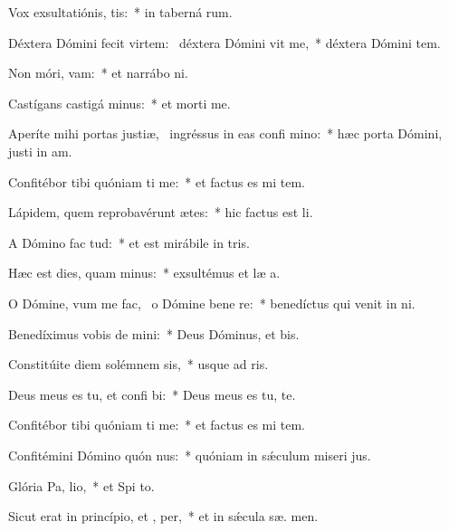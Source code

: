 \item Vox exsultatiónis,  tis:~* in taberná rum.
\item Déxtera Dómini fecit virtem:~\pscross{} déxtera Dómini vit me,~* déxtera Dómini  tem.
\item Non móri,  vam:~* et narrábo  ni.
\item Castígans castigá  minus:~* et morti   me.
\item Aperíte mihi portas justiæ,~\pscross{} ingréssus in eas confi mino:~* hæc porta Dómini, justi in  am.
\item Confitébor tibi quóniam ti me:~* et factus es mi  tem.
\item Lápidem, quem reprobavérunt ætes:~* hic factus est   li.
\item A Dómino fac  tud:~* et est mirábile in  tris.
\item Hæc est dies, quam  minus:~* exsultémus et læ  a.
\item O Dómine, vum me fac,~\pscross{} o Dómine bene re:~* benedíctus qui venit in  ni.
\item Benedíximus vobis de  mini:~* Deus Dóminus, et  bis.
\item Constitúite diem solémnem  sis,~* usque ad  ris.
\item Deus meus es tu, et confi bi:~* Deus meus es tu,   te.
\item Confitébor tibi quóniam ti me:~* et factus es mi  tem.
\item Confitémini Dómino quón nus:~* quóniam in sǽculum miseri jus.
\item Glória Pa,  lio,~* et Spi to.
\item Sicut erat in princípio, et ,  per,~* et in sǽcula sæ. men.
